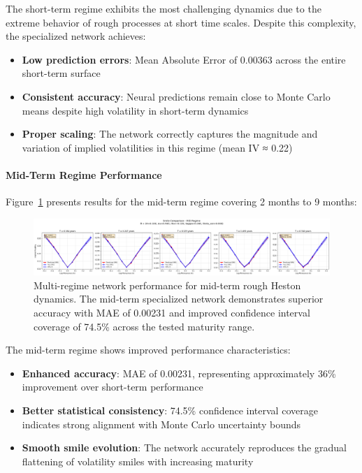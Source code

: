 	The short-term regime exhibits the most challenging dynamics due to the extreme behavior of rough processes at short time scales. Despite this complexity, the specialized network achieves:
	
	\begin{itemize}[nosep]
		\item \textbf{Low prediction errors}: Mean Absolute Error of 0.00363 across the entire short-term surface
		\item \textbf{Consistent accuracy}: Neural predictions remain close to Monte Carlo means despite high volatility in short-term dynamics
		\item \textbf{Proper scaling}: The network correctly captures the magnitude and variation of implied volatilities in this regime (mean IV ≈ 0.22)
	\end{itemize}
	
	\paragraph{Mid-Term Regime Performance}
	
	Figure~\ref{fig:multiregime-mid} presents results for the mid-term regime covering 2 months to 9 months:
	
	\begin{figure}[ht]
		\centering
		\includegraphics[width=\textwidth]{../images/smile_comparison_mid_regime.png}
		\caption{Multi-regime network performance for mid-term rough Heston dynamics. The mid-term specialized network demonstrates superior accuracy with MAE of 0.00231 and improved confidence interval coverage of 74.5\% across the tested maturity range.}
		\label{fig:multiregime-mid}
	\end{figure}
	
	The mid-term regime shows improved performance characteristics:
	
	\begin{itemize}[nosep]
		\item \textbf{Enhanced accuracy}: MAE of 0.00231, representing approximately 36\% improvement over short-term performance
		\item \textbf{Better statistical consistency}: 74.5\% confidence interval coverage indicates strong alignment with Monte Carlo uncertainty bounds
		\item \textbf{Smooth smile evolution}: The network accurately reproduces the gradual flattening of volatility smiles with increasing maturity
	\end{itemize}
	

